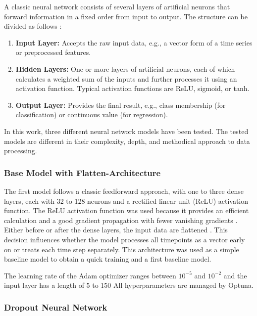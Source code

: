 A classic neural network consists of several layers of artificial neurons that forward information in a fixed order from input to output.
The structure can be divided as follows \cite{nn-basics}:

\begin{enumerate}
    \item \textbf{Input Layer:} Accepts the raw input data, e.g., a vector form of a time series or preprocessed features.
    \item \textbf{Hidden Layers:} One or more layers of artificial neurons, each of which calculates a weighted sum of the inputs and further processes it using an activation function.
    Typical activation functions are ReLU, sigmoid, or tanh.
    \item \textbf{Output Layer:} Provides the final result, e.g., class membership (for classification) or continuous value (for regression).
\end{enumerate}

In this work, three different neural network models have been tested.
The tested models are different in their complexity, depth, and methodical approach to data processing.

\subsubsection{Base Model with Flatten-Architecture}

The first model follows a classic feedforward approach, with one to three dense layers, each with 32 to 128 neurons and a rectified linear unit (ReLU) activation function.
The ReLU activation function was used because it provides an efficient calculation and a good gradient propagation with fewer vanishing gradients \cite{springer-ml-basics}.
Either before or after the dense layers, the input data are flattened \cite{keras-flatten}.
This decision influences whether the model processes all timepoints as a vector early on or treats each time step separately.
This architecture was used as a simple baseline model to obtain a quick training and a first baseline model.

The learning rate of the Adam optimizer ranges between $10^{-5}$ and $10^{-2}$ and the input layer has a length of 5 to 150
All hyperparameters are managed by Optuna.



\subsubsection{Dropout Neural Network}

